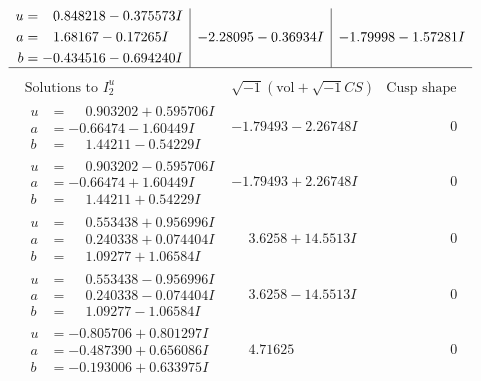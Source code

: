 \documentclass[1p]{elsarticle_modified}
\theoremstyle{definition}
\newcommand{\I}{\sqrt{-1}}
\begin{document}
$$\begin{array}{c|c|c}
\begin{aligned}
u &= \phantom{-}0.848218 - 0.375573 I \\
a &= \phantom{-}1.68167 - 0.17265 I \\
b &= -0.434516 - 0.694240 I\end{aligned}
 & -2.28095 - 0.36934 I & -1.79998 - 1.57281 I\\
 \hline 
 \end{array}$$\newpage$$\begin{array}{c|c|c}  
\text{Solutions to }I^u_{2}& \I (\text{vol} + \sqrt{-1}CS) & \text{Cusp shape}\\
 \hline 
\begin{aligned}
u &= \phantom{-}0.903202 + 0.595706 I \\
a &= -0.66474 - 1.60449 I \\
b &= \phantom{-}1.44211 - 0.54229 I\end{aligned}
 & -1.79493 - 2.26748 I & \phantom{-0.000000 } 0 \\ \hline\begin{aligned}
u &= \phantom{-}0.903202 - 0.595706 I \\
a &= -0.66474 + 1.60449 I \\
b &= \phantom{-}1.44211 + 0.54229 I\end{aligned}
 & -1.79493 + 2.26748 I & \phantom{-0.000000 } 0 \\ \hline\begin{aligned}
u &= \phantom{-}0.553438 + 0.956996 I \\
a &= \phantom{-}0.240338 + 0.074404 I \\
b &= \phantom{-}1.09277 + 1.06584 I\end{aligned}
 & \phantom{-}3.6258 + 14.5513 I & \phantom{-0.000000 } 0 \\ \hline\begin{aligned}
u &= \phantom{-}0.553438 - 0.956996 I \\
a &= \phantom{-}0.240338 - 0.074404 I \\
b &= \phantom{-}1.09277 - 1.06584 I\end{aligned}
 & \phantom{-}3.6258 - 14.5513 I & \phantom{-0.000000 } 0 \\ \hline\begin{aligned}
u &= -0.805706 + 0.801297 I \\
a &= -0.487390 + 0.656086 I \\
b &= -0.193006 + 0.633975 I\end{aligned}
 & \phantom{-}4.71625\phantom{ +0.000000I} & \phantom{-0.000000 } 0 \\ \hline\begin{aligned}

\end{aligned}
\end{array}$$
\end{document}
